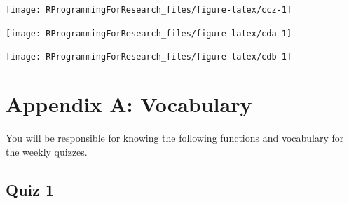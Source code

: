 \documentclass[]{book}
\makeatletter
\newenvironment{Shaded}{\begin{snugshade}}{\end{snugshade}}
\newcommand{\KeywordTok}[1]{\textcolor[rgb]{0.13,0.29,0.53}{\textbf{#1}}}
\newcommand{\DataTypeTok}[1]{\textcolor[rgb]{0.13,0.29,0.53}{#1}}
\newcommand{\StringTok}[1]{\textcolor[rgb]{0.31,0.60,0.02}{#1}}
\newcommand{\OperatorTok}[1]{\textcolor[rgb]{0.81,0.36,0.00}{\textbf{#1}}}
\newcommand{\NormalTok}[1]{#1}
\newenvironment{kframe}{%
\medskip{}
\setlength{\fboxsep}{.8em}
 \def\at@end@of@kframe{}%
 \ifinner\ifhmode%
  \def\at@end@of@kframe{\end{minipage}}%
  \begin{minipage}{\columnwidth}%
 \fi\fi%
 \def\FrameCommand##1{\hskip\@totalleftmargin \hskip-\fboxsep
 \colorbox{shadecolor}{##1}\hskip-\fboxsep
     \hskip-\linewidth \hskip-\@totalleftmargin \hskip\columnwidth}%
 \MakeFramed {\advance\hsize-\width
   \@totalleftmargin\z@ \linewidth\hsize
   \@setminipage}}%
 {\par\unskip\endMakeFramed%
 \at@end@of@kframe}
\renewenvironment{Shaded}{\begin{kframe}}{\end{kframe}}
\theoremstyle{definition}
\theoremstyle{definition}
\theoremstyle{definition}
\theoremstyle{remark}
\makeatother
\begin{document}
\begin{Shaded}
\end{Shaded}

\begin{center}\texttt{[image: RProgrammingForResearch\_files/figure-latex/ccz-1]} \end{center}

\begin{center}\texttt{[image: RProgrammingForResearch\_files/figure-latex/cda-1]} \end{center}

\begin{center}\texttt{[image: RProgrammingForResearch\_files/figure-latex/cdb-1]} \end{center}

\appendix


\chapter{Appendix A: Vocabulary}\label{appendix-a-vocabulary}

You will be responsible for knowing the following functions and
vocabulary for the weekly quizzes.

\section{Quiz 1}\label{quiz-1}
\end{document}
